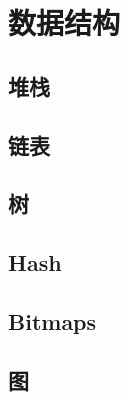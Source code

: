 \section{数据结构}

\subsection{堆栈}

\subsection{链表}

\subsection{树}

\subsection{Hash}

\subsection{Bitmaps}

\subsection{图}
